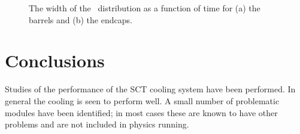 \begin{figure}[h]
 	\centering
  \caption{The width of the \tdiff\ distribution as a function of time for (a)
  the barrels and (b) the endcaps.}
	\label{fig:sigma-evo-tavg}
\end{figure}

\section{Conclusions}

Studies of the performance of the SCT cooling system have been performed. In
general the cooling is seen to perform well. A small number of problematic
modules have been identified; in most cases these are known to have other
problems and are not included in physics running.
